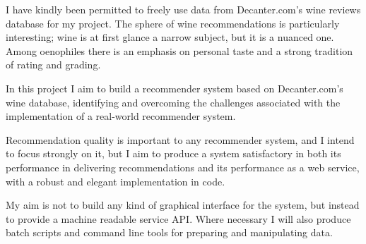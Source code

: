 I have kindly been permitted to freely use data from Decanter.com's wine reviews database \cite{DecanterWine} for my project. The sphere of wine recommendations is particularly interesting; wine is at first glance a narrow subject, but it is a nuanced one. Among oenophiles there is an emphasis on personal taste and a strong tradition of rating and grading. 

In this project I aim to build a recommender system based on Decanter.com's wine database, identifying and overcoming the challenges associated with the implementation of a real-world recommender system.

Recommendation quality is important to any recommender system, and I intend to focus strongly on it, but I aim to produce a system satisfactory in both its performance in delivering recommendations and its performance as a web service, with a robust and elegant implementation in code. 

My aim is not to build any kind of graphical interface for the system, but instead to provide a machine readable service API. Where necessary I will also produce batch scripts and command line tools for preparing and manipulating data.

